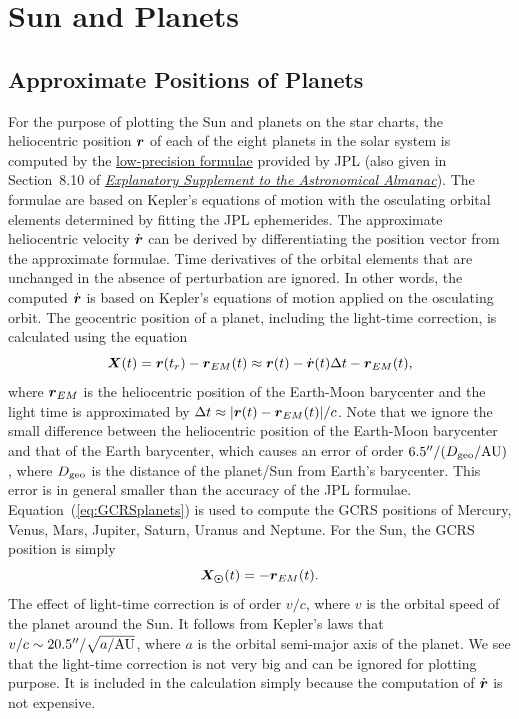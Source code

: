\documentclass[12pt]{article}
\newcommand \beq {\begin{equation}}
\newcommand \eeq {\end{equation}}
\newcommand{\ve}[1]{\mbox{\boldmath $#1$}}
\newcommand{\expl}{\href{http://www.uscibooks.com/urban.htm}{\it Explanatory Supplement to the Astronomical Almanac}}
\begin{document}
\section{Sun and Planets}

\subsection{Approximate Positions of Planets} 

For the purpose of plotting the Sun and planets on the star charts, the
heliocentric position $\ve{r}$ of each of the eight planets in the solar system 
is computed by the \href{https://ssd.jpl.nasa.gov/?planet_pos}{low-precision formulae} 
provided by JPL (also given in Section~8.10 of \expl). The formulae are based on 
Kepler's equations of motion with the osculating orbital elements determined 
by fitting the JPL ephemerides. The approximate heliocentric 
velocity $\dot{\ve{r}}$ can be derived by differentiating the position 
vector from the approximate formulae. Time derivatives of the orbital elements 
that are unchanged in the absence of perturbation are ignored. In other words, 
the computed $\dot{\ve{r}}$ is based on Kepler's equations of motion applied 
on the osculating orbit.
The geocentric position of a planet, including the light-time correction, is calculated 
using the equation 
\beq
  \ve{X}(t) = \ve{r}(t_r) - \ve{r}_{EM}(t) 
\approx \ve{r}(t) - \dot{\ve{r}}(t) \Delta t - \ve{r}_{EM}(t) ,
\label{eq:GCRSplanets}
\eeq
where $\ve{r}_{EM}$ is the heliocentric position of the 
Earth-Moon barycenter and the light time is approximated by 
$\Delta t \approx |\ve{r}(t) - \ve{r}_{EM}(t)|/c$. 
Note that we ignore the small difference between the heliocentric position of 
the Earth-Moon barycenter and that of the Earth barycenter, which causes 
an error of order $6.5''/(D_{\rm geo}/{\rm AU})$, where $D_{\rm geo}$ is the distance of the 
planet/Sun from Earth's barycenter. This error is in general smaller than the accuracy 
of the JPL formulae. 
Equation~(\ref{eq:GCRSplanets}) is used to compute the GCRS positions 
of Mercury, Venus, Mars, Jupiter, Saturn, Uranus and Neptune. For the Sun, 
the GCRS position is simply 
\beq
  \ve{X_{\odot}}(t) = -\ve{r}_{EM}(t) .
\label{eq:GCRSsun}
\eeq
The effect of light-time correction is of order $v/c$, 
where $v$ is the orbital speed of the planet around the Sun. It follows from 
Kepler's laws that $v/c \sim 20.5''/\sqrt{a/{\rm AU}}$, where $a$ is the orbital 
semi-major axis of the planet. We see that the light-time correction is 
not very big and can be ignored for plotting purpose. It is included 
in the calculation simply because the computation of $\dot{\ve{r}}$ is 
not expensive.
\end{document}
